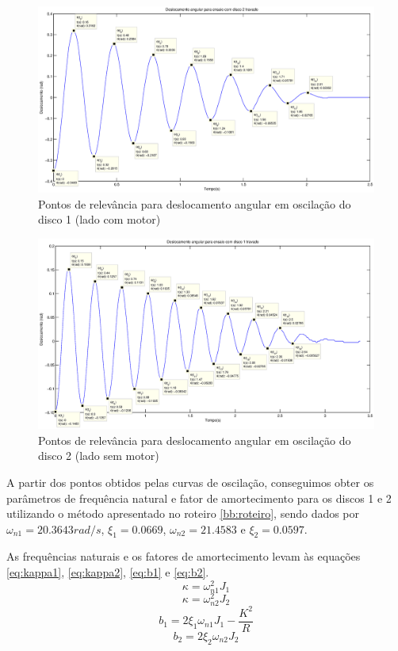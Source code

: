 \documentclass{article}
\begin{document}
\begin{figure}[H]
	\centering
	\includegraphics[width=0.8\linewidth]{../disco2travado}
	\caption{Pontos de relevância para deslocamento angular em oscilação do disco 1 (lado com motor)}
	\label{fig:disco2travado}
\end{figure}
\begin{figure}[H]
	\centering
	\includegraphics[width=0.8\linewidth]{../disco1travado}
	\caption{Pontos de relevância para deslocamento angular em oscilação do disco 2 (lado sem motor)}
	\label{fig:disco1travado}
\end{figure}

A partir dos pontos obtidos pelas curvas de oscilação, conseguimos obter os parâmetros de frequência natural e fator de amortecimento para os discos 1 e 2 utilizando o método apresentado no roteiro \ref{bb:roteiro}, sendo dados por $\omega_{n1}=20.3643rad/s$, $\xi_1= 0.0669$, $\omega_{n2}=21.4583$ e $\xi_2=0.0597$.

As frequências naturais e os fatores de amortecimento levam às equações \ref{eq:kappa1}, \ref{eq:kappa2}, \ref{eq:b1} e \ref{eq:b2}. 
\begin{equation}
\label{eq:kappa1}
\kappa=\omega_{n1}^2J_1
\end{equation}
\begin{equation}
\label{eq:kappa2}
\kappa=\omega_{n2}^2J_2
\end{equation}
\begin{equation}
\label{eq:b1}
b_1=2\xi_1\omega_{n1}J_1-\frac{K^2}{R}
\end{equation}
\begin{equation}
\label{eq:b2}
b_2=2\xi_2\omega_{n2}J_2
\end{equation}
\end{document}
